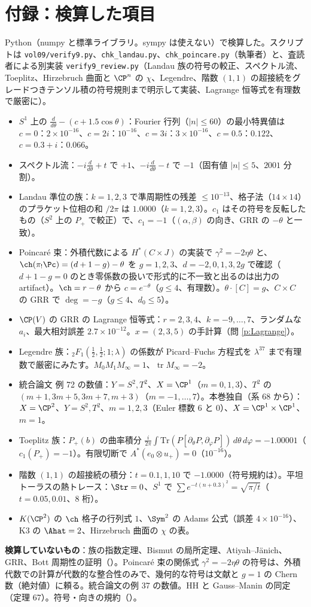 \section*{付録：検算した項目}
Python（numpy と標準ライブラリ。sympy は使えない）で検算した。スクリプトは \texttt{vol09/verify9.py}、\texttt{chk\_landau.py}、\texttt{chk\_poincare.py}（執筆者）と、査読者による別実装 \texttt{verify9\_review.py}（Landau 族の符号の較正、スペクトル流、Toeplitz、Hirzebruch 曲面と $\CP^n$ の $\chi$、Legendre、階数 $(1,1)$ の超接続をグレードつきテンソル積の符号規則まで明示して実装、Lagrange 恒等式を有理数で厳密に）。
\begin{itemize}
\item $S^1$ 上の $\frac d{d\theta}-(c+1.5\cos\theta)$：Fourier 行列（$|n|\le60$）の最小特異値は $c=0$：$2\times10^{-16}$、$c=2i$：$10^{-16}$、$c=3i$：$3\times10^{-16}$、$c=0.5$：$0.122$、$c=0.3+i$：$0.066$。
\item スペクトル流：$-i\frac d{d\theta}+t$ で $+1$、$-i\frac d{d\theta}-t$ で $-1$（固有値 $|n|\le5$、$2001$ 分割）。
\item Landau 準位の族：$k=1,2,3$ で準周期性の残差 $\le10^{-13}$、格子法（$14\times14$）のプラケット位相の和 $/2\pi$ は $1.0000$（$k=1,2,3$）。$c_1$ はその符号を反転したもの（$S^2$ 上の $P_+$ で較正）で、$c_1=-1$（$(\alpha,\beta)$ の向き、GRR の $-\theta$ と一致）。
\item Poincaré 束：外積代数による $H^*(C\times J)$ の実装で $\gamma^2=-2\eta\theta$ と、$\ch(\pi_!\Pc)=(d+1-g)-\theta$ を $g=1,2,3$、$d=-2,0,1,3,2g$ で確認（$d+1-g=0$ のとき零係数の扱いで形式的に不一致と出るのは出力の artifact）。$\ch=r-\theta$ から $c=e^{-\theta}$（$g\le4$、有理数）。$\theta\cdot[C]=g$、$C\times C$ の GRR で $\deg=-g$（$g\le4$、$d_0\le5$）。
\item $\CP(V)$ の GRR の Lagrange 恒等式：$r=2,3,4$、$k=-9,\dots,7$、ランダムな $a_i$、最大相対誤差 $2.7\times10^{-12}$。$x=(2,3,5)$ の手計算（問 \ref{p:Lagrange}）。
\item Legendre 族：$_2F_1(\frac12,\frac12;1;\lambda)$ の係数が Picard--Fuchs 方程式を $\lambda^{37}$ まで有理数で厳密にみたす。$M_0M_1M_\infty=1$、$\operatorname{tr}M_\infty=-2$。
\item 統合論文 例 72 の数値：$Y=S^2,T^2$、$X=\CP^1$（$m=0,1,3$）、$T^2$ の $(m+1,3m+5,3m+7,m+3)$（$m=-1,\dots,7$）。本巻独自（系 68 から）：$X=\CP^2$、$Y=S^2,T^2$、$m=1,2,3$（Euler 標数 $6$ と $0$）、$X=\CP^1\times\CP^1$、$m=1$。
\item Toeplitz 族：$P_+(b)$ の曲率積分 $\frac i{2\pi}\int\mathrm{Tr}(P[\partial_\theta P,\partial_\varphi P])\,d\theta\,d\varphi=-1.00001$（$c_1(P_+)=-1$）。有限切断で $A^*(e_0\otimes u_+)=0$（$10^{-16}$）。
\item 階数 $(1,1)$ の超接続の積分：$t=0.1,1,10$ で $-1.0000$（符号規約は\tQ）。平坦トーラスの熱トレース：$\Str=0$、$S^1$ で $\sum e^{-t(n+0.3)^2}=\sqrt{\pi/t}$（$t=0.05,0.01$、$8$ 桁）。
\item $K(\CP^2)$ の $\ch$ 格子の行列式 $1$、$\Sym^2$ の Adams 公式（誤差 $4\times10^{-16}$）、K3 の $\Ahat=2$、Hirzebruch 曲面の $\chi$ の表。
\end{itemize}
\textbf{検算していないもの}：族の指数定理、Bismut の局所定理、Atiyah--J\"anich、GRR、Bott 周期性の証明（\tC）。Poincaré 束の関係式 $\gamma^2=-2\eta\theta$ の符号は、外積代数での計算が代数的な整合性のみで、幾何的な符号は文献と $g=1$ の Chern 数（絶対値）に頼る。統合論文の例 37 の数値。$\mathrm{HH}$ と Gauss--Manin の同定（定理 67）。符号・向きの規約（\tQ）。


